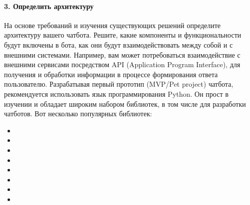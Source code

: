 \documentclass[letterpaper,10pt,russian]{sphinxmanual}
\begin{document}
\paragraph{3. Определить архитектуру}
\label{\detokenize{educational_materials/uml/content:id12}}
\sphinxAtStartPar
На основе требований и изучения существующих решений определите архитектуру вашего чат\sphinxhyphen{}бота. Решите, какие компоненты и функциональности будут включены в бота, как они будут взаимодействовать между собой и с внешними системами. Например, вам может потребоваться взаимодействие с внешними сервисами посредством API (Application Program Interface), для получения и обработки информации в процессе формирования ответа пользователю. Разрабатывая первый прототип (MVP/Pet project) чат\sphinxhyphen{}бота, рекомендуется использовать язык программирования Python. Он прост в изучении и обладает широким набором библиотек, в том числе для разработки чат\sphinxhyphen{}ботов. Вот несколько популярных библиотек:
\begin{itemize}
\item {} 
\sphinxAtStartPar
{}

\item {} 
\sphinxAtStartPar
{}

\item {} 
\sphinxAtStartPar
{}

\item {} 
\sphinxAtStartPar
{}

\item {} 
\sphinxAtStartPar
{}

\item {} 
\sphinxAtStartPar
{}

\item {} 
\sphinxAtStartPar
{}

\item {} 
\sphinxAtStartPar
{}

\end{itemize}
\end{document}
